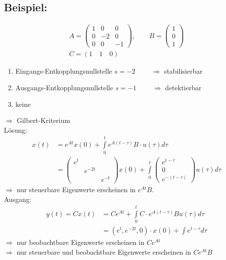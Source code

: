 \documentclass[ngerman]{tudscrreprt}
\begin{document}
\subsection*{Beispiel:} 
\begin{align*}
A = \begin{pmatrix}
1 & 0 & 0\\ 0 & -2 & 0\\ 0 & 0 & -1 \end{pmatrix}, \qquad B = \begin{pmatrix} 1\\ 0\\ 1\end{pmatrix}\\ 
C = (1\quad 1\quad 0) 
\end{align*}
\begin{enumerate}
\item Eingangs-Entkopplungsnullstelle $s = -2\qquad $ $\Rightarrow$ stabilisierbar
\item Ausgangs-Entkopplungsnullstelle $s = -1\qquad $ $\Rightarrow$ detektierbar
\item keine 
\end{enumerate}
$\Rightarrow$ Gilbert-Kriterium\\ 
Lösung: \begin{align*} x(t) &= e^{At}x(0) + \int\limits_{0}^t e^{A(t-\tau)}B\cdot u(\tau)d\tau \\ 
&=\begin{pmatrix} e^t && \\ & e^{-2t} &\\ &&e^{-t} \end{pmatrix} x(0) + \int\limits_{0}^t\begin{pmatrix} e^{t-\tau}\\ 0\\ e^{-(t-\tau)}\end{pmatrix} u(\tau) d\tau
\end{align*}
$\Rightarrow$ nur steuerbare Eigenwerte erscheinen in $e^{At} B.$\\ 
Ausgang: 
\begin{align*}
y(t) = C x(t) &= C e^{At} + \int\limits_0^t C\cdot e^{A(t-\tau)}Bu(\tau) d\tau \\ 
&= (e^{t}, e^{-2t}, 0)\cdot x(0) + \int e^{t-\tau} d\tau 
\end{align*}
$\Rightarrow$ nur beobachtbare Eigenwerte erscheinen in $C e^{At}$\\ 
$\Rightarrow$ nur steuerbare und beobachtbare Eigenwerte erscheinen in $C e^{At} B$
\end{document}
